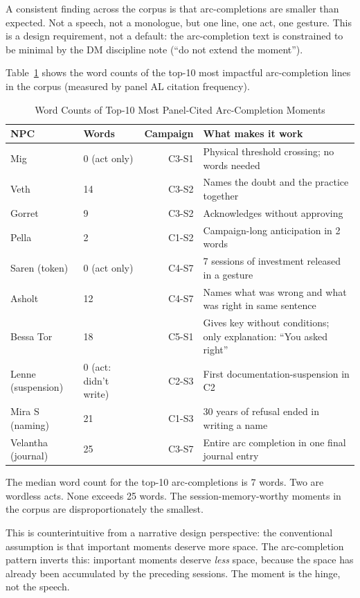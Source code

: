 A consistent finding across the corpus is that arc-completions are smaller than
expected. Not a speech, not a monologue, but one line, one act, one gesture. This is
a design requirement, not a default: the arc-completion text is constrained to be
minimal by the DM discipline note (``do not extend the moment'').

Table~\ref{tab:small-moments} shows the word counts of the top-10 most impactful
arc-completion lines in the corpus (measured by panel AL citation frequency).

\begin{table}[t]
\caption{Word Counts of Top-10 Most Panel-Cited Arc-Completion Moments}
\label{tab:small-moments}
\begin{tabular}{@{}llrl@{}}
\toprule
NPC & Words & Campaign & What makes it work \\
\midrule
Mig & 0 (act only) & C3-S1 & Physical threshold crossing; no words needed \\
Veth & 14 & C3-S2 & Names the doubt and the practice together \\
Gorret & 9 & C3-S2 & Acknowledges without approving \\
Pella & 2 & C1-S2 & Campaign-long anticipation in 2 words \\
Saren (token) & 0 (act only) & C4-S7 & 7 sessions of investment released in a gesture \\
Asholt & 12 & C4-S7 & Names what was wrong and what was right in same sentence \\
Bessa Tor & 18 & C5-S1 & Gives key without conditions; only explanation: ``You asked right'' \\
Lenne (suspension) & 0 (act: didn't write) & C2-S3 & First documentation-suspension in C2 \\
Mira S (naming) & 21 & C1-S3 & 30 years of refusal ended in writing a name \\
Velantha (journal) & 25 & C3-S7 & Entire arc completion in one final journal entry \\
\bottomrule
\end{tabular}
\end{table}

The median word count for the top-10 arc-completions is 7 words. Two are wordless acts.
None exceeds 25 words. The session-memory-worthy moments in the corpus are
disproportionately the smallest.

This is counterintuitive from a narrative design perspective: the conventional assumption
is that important moments deserve more space. The arc-completion pattern inverts this:
important moments deserve \textit{less} space, because the space has already been
accumulated by the preceding sessions. The moment is the hinge, not the speech.

